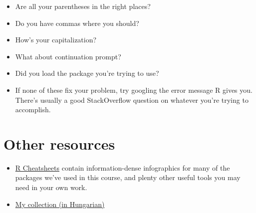 \documentclass[
]{book}
\providecommand{\tightlist}{%
  \setlength{\itemsep}{0pt}\setlength{\parskip}{0pt}}
\begin{document}
\begin{itemize}
\tightlist
\item
  Are all your parentheses in the right places?
\item
  Do you have commas where you should?
\item
  How's your capitalization?
\item
  What about continuation prompt?
\item
  Did you load the package you're trying to use?
\item
  If none of these fix your problem, try googling the error message R gives you. There's usually a good StackOverflow question on whatever you're trying to accomplish.
\end{itemize}

\hypertarget{other-resources}{%
\section{Other resources}\label{other-resources}}

\begin{itemize}
\tightlist
\item
  \href{https://www.rstudio.com/resources/cheatsheets/}{R Cheatsheets} contain information-dense infographics for many of the packages we've used in this course, and plenty other useful tools you may need in your own work.
\item
  \href{https://abarik.github.io/roforrasok/}{My collection (in Hungarian)}
\end{itemize}

  
\end{document}

